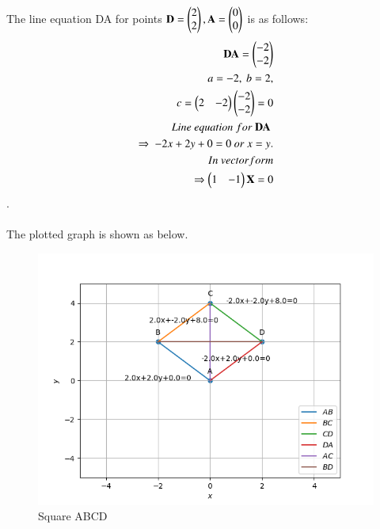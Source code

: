 \documentclass[journal,12pt,twocolumn]{IEEEtran}
\begin{document}
\\
\\
The line equation DA for points $\mathbf{D} = \begin{pmatrix}2\\2\end{pmatrix}, \mathbf{A} = \begin{pmatrix}0\\0\end{pmatrix}$ is as follows:\\
\begin{align}
\begin{split}
\mathbf{DA} = \begin{pmatrix}-2\\-2\end{pmatrix}\\
a=-2,\ b=2,\\
c=\begin{pmatrix}2 & -2\end{pmatrix} \begin{pmatrix}-2\\-2\end{pmatrix}=0\\
Line\ equation\ for\ \mathbf{DA}\ \\ \Rightarrow\ -2x+2y+0=0 \ or \ x=y. \\
In\ vector form\\
\Rightarrow \begin{pmatrix}1&-1\end{pmatrix}\mathbf{X}=0
\end{split}
\end{align}.
\\
\\
The plotted graph is shown as below.
\begin{figure}[!ht]
    \centering
    \includegraphics[width=\columnwidth]{assignment2_shiftingvertices.png}
    \caption{Square ABCD}
    \label{fig:Square ABCD}
\end{figure}
\end{document}
